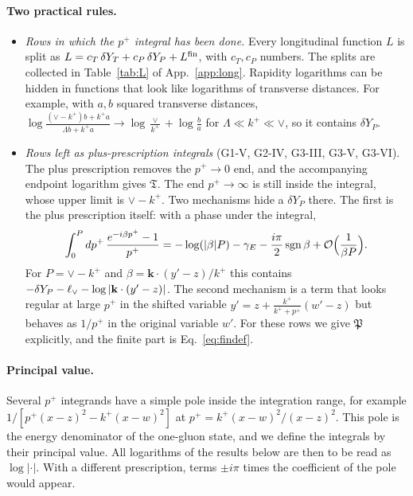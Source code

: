 \paragraph*{Two practical rules.}
\begin{itemize}
\item[(A)] \emph{Rows in which the $p^+$ integral has been done.} Every longitudinal function $L$ is split as $L=c_T\,\delta Y_T+c_P\,\delta Y_P+L^{\rm fin}$, with $c_T,c_P$ numbers. The splits are collected in Table~\ref{tab:L} of App.~\ref{app:long}. Rapidity logarithms can be hidden in functions that look like logarithms of transverse distances. For example, with $a,b$ squared transverse distances, $\log\frac{(\vee-k^+)b+k^+a}{\Lambda b+k^+a}\to\log\frac{\vee}{k^+}+\log\frac{b}{a}$ for $\Lambda\ll k^+\ll\vee$, so it contains $\delta Y_P$.
\item[(B)] \emph{Rows left as plus-prescription integrals} (G1-V, G2-IV, G3-III, G3-V, G3-VI). The plus prescription removes the $p^+\to0$ end, and the accompanying endpoint logarithm gives $\mathfrak T$. The end $p^+\to\infty$ is still inside the integral, whose upper limit is $\vee-k^+$. Two mechanisms hide a $\delta Y_P$ there. The first is the plus prescription itself: with a phase under the integral,
\begin{equation}
\int_0^Pdp^+\,\frac{e^{-i\beta p^+}-1}{p^+}=-\log(|\beta|P)-\gamma_E-\frac{i\pi}{2}\,{\rm sgn}\,\beta+\mathcal{O}\Big(\frac{1}{\beta P}\Big).
\label{eq:phase}
\end{equation}
For $P=\vee-k^+$ and $\beta=\mathbf k\cdot(y'-z)/k^+$ this contains $-\delta Y_P-\ell_{\vee}-\log|\mathbf k\cdot(y'-z)|$. The second mechanism is a term that looks regular at large $p^+$ in the shifted variable $y'=z+\frac{k^+}{k^++p^+}(w'-z)$ but behaves as $1/p^+$ in the original variable $w'$. For these rows we give $\mathfrak P$ explicitly, and the finite part is Eq.~\eqref{eq:findef}.
\end{itemize}

\paragraph*{Principal value.} Several $p^+$ integrands have a simple pole inside the integration range, for example $1/[p^+(x-z)^2-k^+(x-w)^2]$ at $p^+=k^+(x-w)^2/(x-z)^2$. This pole is the energy denominator of the one-gluon state, and we define the integrals by their principal value. All logarithms of the results below are then to be read as $\log|\cdot|$. With a different prescription, terms $\pm i\pi$ times the coefficient of the pole would appear.

